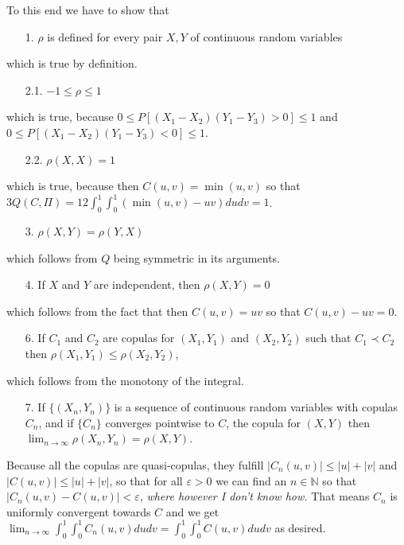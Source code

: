 \documentclass{article}
\begin{document}
To this end we have to show that
\begin{itemize}
\item [1.] $\rho$ is defined for every pair $X,Y$ of continuous random variables
\end{itemize}
which is true by definition.
\begin{itemize}
\item [2.1.] $-1\leq \rho \leq 1$ 
\end{itemize}
which is true, because $0\leq P[(X_1-X_2)(Y_1-Y_3)>0]\leq1$ and $0\leq P[(X_1-X_2)(Y_1-Y_3)<0]\leq1$.
\begin{itemize}
\item [2.2.] $\rho(X,X)=1$ 
\end{itemize}
which is true, because then $C(u,v)=\min(u,v)$ so that $3Q(C,\Pi)=12\int_0^1\int_0^1(\min(u,v)-uv)dudv=1$.
\begin{itemize}
\item [3.] $\rho(X,Y)=\rho(Y,X)$
\end{itemize}
which follows from $Q$ being symmetric in its arguments.
\begin{itemize}
\item [4.] If $X$ and $Y$ are independent, then $\rho(X,Y)=0$
\end{itemize}
which follows from the fact that then $C(u,v)=uv$ so that $C(u,v)-uv=0$.
\begin{itemize}
\item [6.] If $C_1$ and $C_2$ are copulas for $(X_1,Y_1)$ and $(X_2,Y_2)$ such that $C_1\prec C_2$ then $\rho(X_1,Y_1)\leq \rho(X_2,Y_2)$,
\end{itemize}
which follows from the monotony of the integral.
\begin{itemize}
\item [7.] If $\{(X_n,Y_n)\}$ is a sequence of continuous random variables with copulas $C_n$, and if $\{C_n\}$ converges pointwise to $C$, the copula for $(X,Y)$ then $\lim_{n\to\infty}\rho(X_n,Y_n)=\rho(X,Y)$.
\end{itemize}
Because all the copulas are quasi-copulas, they fulfill $|C_n(u,v)|\leq|u|+|v|$ and $|C(u,v)|\leq|u|+|v|$, so that for all $\varepsilon>0$ we can find an $n\in\mathbb{N}$ so that $|C_n(u,v)-C(u,v)|<\varepsilon$, \emph{where however I don't know how.}
That means $C_n$ is uniformly convergent towards $C$ and we get $\lim_{n\to\infty}\int_0^1\int_0^1C_n(u,v)dudv=\int_0^1\int_0^1C(u,v)dudv$ as desired.

\end{document}
